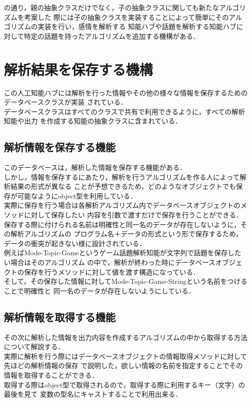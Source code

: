 の通り，親の抽象クラスだけでなく，子の抽象クラスに関しても新たなアルゴリズムを考案した
際には子の抽象クラスを実装することによって簡単にそのアルゴリズムの実装を行い，感情を解析する
知能ハブや話題を解析する知能ハブに対して特定の話題を持ったアルゴリズムを追加する機構がある．

\newpage

\section{解析結果を保存する機構}
この人工知能ハブには解析を行った情報やその他の様々な情報を保存するためのデータベースクラスが実装
されている．
\\
データベースクラスはすべてのクラスで共有で利用できるように，すべての解析知能や出力
を作成する知能の抽象クラスに含まれている．
\\

\subsection{解析情報を保存する機能}
このデータベースは，解析した情報を保存する機能がある．
\\
しかし，情報を保存するにあたり，解析を行うアルゴリズムを作る人によって解析結果の形式が異なる
ことが予想できるため，どのようなオブジェクトでも保存が可能なようにobject型を利用している．
\\
実際に保存を行う場合は各解析アルゴリズム内でデータベースオブジェクトのメソッドに対して保存したい
内容を引数で渡すだけで保存を行うことができる．
\\
保存する際に付けられる名前は明確性と同一名のデータが存在しないように，その解析アルゴリズムの
プログラム名＋データの形式という形で保存するため，データの衝突が起きない様に設計されている．
\\
例えばMode-Topic-Gameというゲーム話題解析知能が文字列で話題を保存したい場合はそのアルゴリズム
の中で，解析が終わった時にデータベースオブジェクトの保存を行うメソッドに対して値を渡す構造になっている．
\\
そして，その保存した情報に対してMode-Topic-Game-Stringという名前をつけることで明確性と
同一名のデータが存在しないようにしている．
\\
\subsection{解析情報を取得する機能}
その次に解析した情報を出力内容を作成するアルゴリズムの中から取得する方法について解説する．\\
実際に解析を行う際にはデータベースオブジェクトの情報取得メソッドに対して先ほどの解析情報の保存
で説明した，欲しい情報の名前を指定することでその情報を取得することができる．\\
取得する際はobject型で取得されるので，取得する際に利用するキー（文字）の最後を見て
変数の型名にキャストすることで利用出来る．
\\
\newpage

